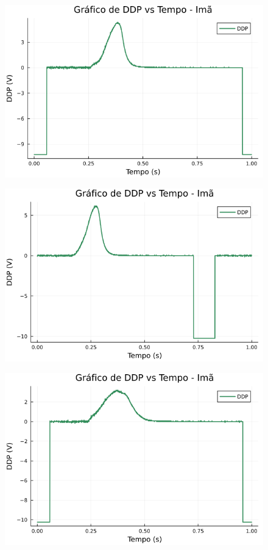 \begin{center}
\begin{multicols}{2}
\begin{figure}[H]
    \centering
    \includegraphics[width=1.0\linewidth]{figuras/grafico_dados1_F0004CH1.png}
\end{figure}

\begin{figure}[H]
    \centering
    \includegraphics[width=1.0\linewidth]{figuras/grafico_dados1_F0005CH1.png}
\end{figure}

\begin{figure}[H]
    \centering
    \includegraphics[width=1.0\linewidth]{figuras/grafico_dados1_F0006CH1.png}
\end{figure}


\end{multicols}
\end{center}
